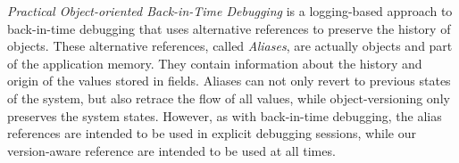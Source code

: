 \emph{Practical Object-oriented Back-in-Time Debugging}\cite{Lienhard2008POB} is a logging-based approach to back-in-time debugging that uses alternative references to preserve the history of objects.
These alternative references, called \emph{Aliases}, are actually objects and part of the application memory.
They contain information about the history and origin of the values stored in fields.
Aliases can not only revert to previous states of the system, but also retrace the flow of all values, while object-versioning only preserves the system states.
However, as with back-in-time debugging, the alias references are intended to be used in explicit debugging sessions, while our version-aware reference are intended to be used at all times.

